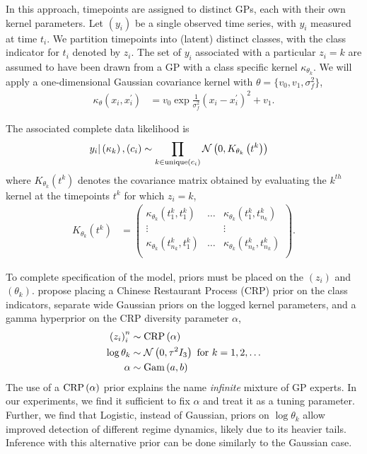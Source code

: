 \documentclass[14pt]{extarticle}
\begin{document}
In this approach, timepoints are assigned to distinct GPs, each with their own
kernel parameters. Let $\left(y_{i}\right)$ be a single observed time series,
with $y_{i}$ measured at time $t_{i}$. We partition timepoints into (latent)
distinct classes, with the class indicator for $t_i$ denoted by $z_i$. The set
of $y_i$ associated with a particular $z_i = k$ are assumed to have been drawn
from a GP with a class specific kernel $\kappa_{\theta_k}$. We will apply a
one-dimensional Gaussian covariance kernel with $\theta = \{v_0, v_1, \sigma_f^2\}$,
\begin{align*}
  \kappa_\theta\left(x_i, x_i^\prime\right) &= v_0 \exp{\frac{1}{\sigma_f^2} \left(x_i - x_i^\prime\right)^2} + v_1.
\end{align*}

The associated complete data likelihood is
\begin{align*}
 y_i \vert \left(\kappa_k\right), \left(c_i\right) &\sim \prod_{k \in \text{unique}\left(c_i\right)} \mathcal{N}\left(0, K_{\theta_k}\left(t^k\right)\right)
\end{align*}
where $K_{\theta_k}\left(t^k\right)$ denotes the covariance matrix obtained by
evaluating the $k^{th}$ kernel at the timepoints $t^k$ for which $z_i = k$,
\begin{align*}
  K_{\theta_k}\left(t^k\right) &= \begin{pmatrix}
    \kappa_{\theta_k}\left(t^k_1, t^k_1\right) & \dots  & \kappa_{\theta_k}\left(t^k_1, t^k_{n_k}\right) \\
    \vdots & & \vdots \\
    \kappa_{\theta_k}\left(t^k_{n_k}, t^k_1\right) & \dots  & \kappa_{\theta_k}\left(t^k_{n_k}, t^k_{n_k}\right) \\
  \end{pmatrix}.
\end{align*}

To complete specification of the model, priors must be placed on the
$\left(z_i\right)$ and $\left(\theta_k\right)$. \cite{rasmussen2002infinite}
propose placing a Chinese Restaurant Process (CRP) prior on the class indicators,
separate wide Gaussian priors on the logged kernel parameters, and a gamma
hyperprior on the CRP diversity parameter $\alpha$,
\begin{align*}
  \left(z_i\right)_i^n &\sim \textnormal{CRP}\left(\alpha\right) \\
  \log \theta_k &\sim \mathcal{N}\left(0, \tau^2 I_3\right) \text{ for } k = 1, 2, \dots \\
  \alpha &\sim \textnormal{Gam}\left(a, b\right)
\end{align*}
The use of a $\textnormal{CRP}\left(\alpha\right)$ prior explains the name \textit{infinite}
mixture of GP experts. In our experiments, we find it sufficient to fix $\alpha$
and treat it as a tuning parameter. Further, we find that Logistic, instead of
Gaussian, priors on $\log \theta_k$ allow improved detection of different regime
dynamics, likely due to its heavier tails. Inference with this alternative prior
can be done similarly to the Gaussian case.
\end{document}
